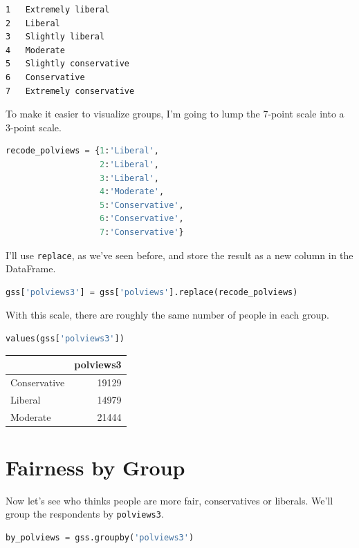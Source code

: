 \begin{lstlisting}[style=output]
1   Extremely liberal
2   Liberal
3   Slightly liberal
4   Moderate
5   Slightly conservative
6   Conservative
7   Extremely conservative
\end{lstlisting}

To make it easier to visualize groups, I'm going to lump the 7-point
scale into a 3-point scale.

\begin{lstlisting}[language=Python,style=source]
recode_polviews = {1:'Liberal', 
                   2:'Liberal', 
                   3:'Liberal', 
                   4:'Moderate', 
                   5:'Conservative', 
                   6:'Conservative', 
                   7:'Conservative'}
\end{lstlisting}

I'll use \passthrough{\lstinline!replace!}, as we've seen before, and
store the result as a new column in the DataFrame.

\begin{lstlisting}[language=Python,style=source]
gss['polviews3'] = gss['polviews'].replace(recode_polviews)
\end{lstlisting}

With this scale, there are roughly the same number of people in each
group.

\begin{lstlisting}[language=Python,style=source]
values(gss['polviews3'])
\end{lstlisting}

\begin{tabular}{lr}
\toprule
{} &  polviews3 \\
\midrule
Conservative &      19129 \\
Liberal      &      14979 \\
Moderate     &      21444 \\
\bottomrule
\end{tabular}

\hypertarget{fairness-by-group}{%
\section{Fairness by Group}\label{fairness-by-group}}

Now let's see who thinks people are more fair, conservatives or
liberals. We'll group the respondents by
\passthrough{\lstinline!polviews3!}.

\begin{lstlisting}[language=Python,style=source]
by_polviews = gss.groupby('polviews3')
\end{lstlisting}

